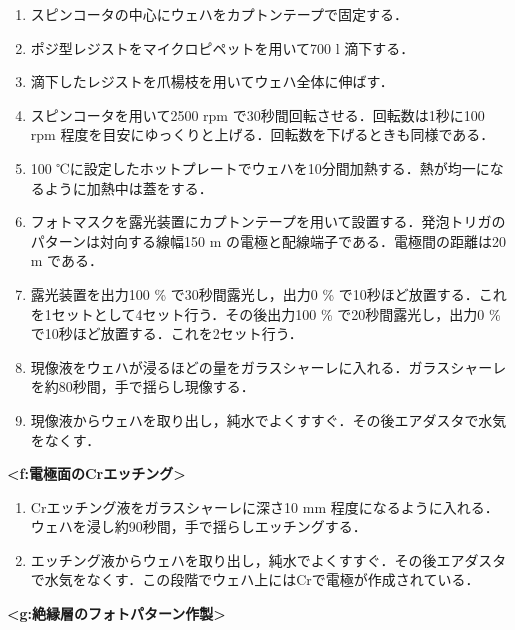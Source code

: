 \begin{enumerate}

\item スピンコータの中心にウェハをカプトンテープで固定する．
\item ポジ型レジストをマイクロピペットを用いて700 \textmu l 滴下する．
\item 滴下したレジストを爪楊枝を用いてウェハ全体に伸ばす．
 
\item スピンコータを用いて2500 rpm で30秒間回転させる．回転数は1秒に100 rpm 程度を目安にゆっくりと上げる．回転数を下げるときも同様である．
\item 100 ℃に設定したホットプレートでウェハを10分間加熱する．熱が均一になるように加熱中は蓋をする．
\item フォトマスクを露光装置にカプトンテープを用いて設置する．発泡トリガのパターンは対向する線幅150 \textmu m の電極と配線端子である．電極間の距離は20 \textmu m である．

\item 露光装置を出力100 \% で30秒間露光し，出力0 \% で10秒ほど放置する．これを1セットとして4セット行う．その後出力100 \% で20秒間露光し，出力0 \% で10秒ほど放置する．これを2セット行う．

\item 現像液をウェハが浸るほどの量をガラスシャーレに入れる．ガラスシャーレを約80秒間，手で揺らし現像する．
\item 現像液からウェハを取り出し，純水でよくすすぐ．その後エアダスタで水気をなくす．


\end{enumerate} 

\vspace{5zh}
\textbf{<f:電極面のCrエッチング>}

\begin{enumerate}
\item Crエッチング液をガラスシャーレに深さ10 mm 程度になるように入れる．ウェハを浸し約90秒間，手で揺らしエッチングする．
\item エッチング液からウェハを取り出し，純水でよくすすぐ．その後エアダスタで水気をなくす．この段階でウェハ上にはCrで電極が作成されている．


\end{enumerate} 

\vspace{5zh}
\textbf{<g:絶縁層のフォトパターン作製>}

